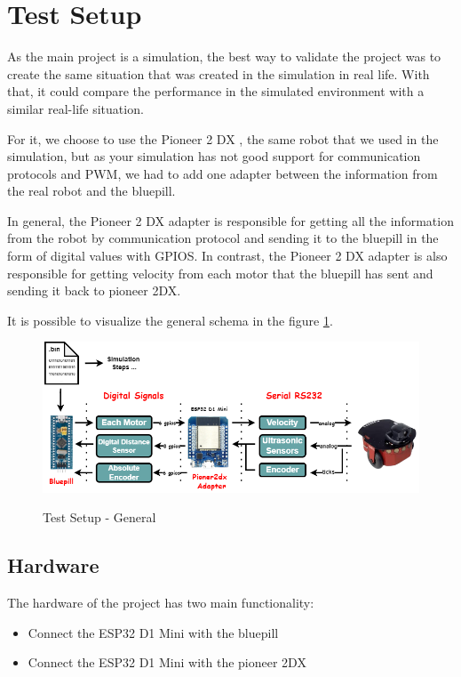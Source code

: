 \documentclass[../../../monografia.tex]{subfiles}
\begin{document}
\section{Test Setup}

As the main project is a simulation, the best way to validate the project was to create the same situation that was created in the simulation in real life. With that, it could compare the performance in the simulated environment with a similar real-life situation.

For it, we choose to use the Pioneer 2 DX \cite{pioneer2dx_2024}, the same robot that we used in the simulation, but as your simulation has not good support for communication protocols and PWM, we had to add one adapter between the information from the real robot and the bluepill.

In general, the Pioneer 2 DX adapter is responsible for getting all the information from the robot by communication protocol and sending it to the bluepill in the form of digital values with GPIOS. In contrast, the Pioneer 2 DX adapter is also responsible for getting velocity from each motor that the bluepill has sent and sending it back to pioneer 2DX.

It is possible to visualize the general schema in the figure \ref{fig: Test Setup - General}.

\begin{figure}[h]
    \centering
    \caption{Test Setup - General}
    \centering %
    \includegraphics[width=16cm]{diagramas-test_setup-general.drawio.png}
    \label{fig: Test Setup - General}
\end{figure}
\subsection{Hardware}

The hardware of the project has two main functionality:

\begin{itemize}
    \item {Connect the ESP32 D1 Mini with the bluepill}
    \item {Connect the ESP32 D1 Mini with the pioneer 2DX}
\end{itemize}
\end{document}
